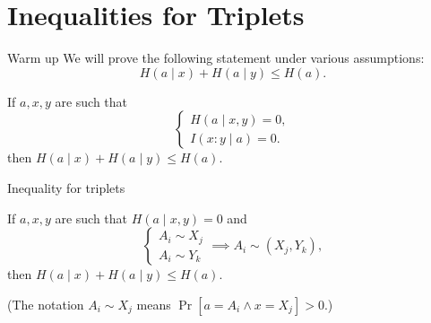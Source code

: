 \documentclass[handout,aspectratio=169]{beamer}
\begin{document}
	\section{Inequalities for Triplets}
    \begin{frame}{Warm up}
		We will prove the following statement under various assumptions:
		\[
		    H(a \mid x) + H(a \mid y) \le H(a).
		\]
		
		\begin{problem}
		    If \(a, x, y\) are such that
		\[
		    \begin{cases}
		        H(a \mid x, y) = 0,\\
		        I(x : y \mid a) = 0.
		    \end{cases}
		\]
		then \(H(a \mid x) + H(a \mid y) \le H(a)\).
		\end{problem}
    \end{frame}

    \begin{frame}{Inequality for triplets}
    \begin{theorem}
        If \(a, x, y\) are such that \(H(a \mid x, y) = 0\) and
    \[
        \begin{cases}
            A_i \sim X_j\\
            A_i \sim Y_k
        \end{cases} \implies A_i \sim (X_j, Y_k),
    \]
    then \(H(a \mid x) + H(a \mid y) \le H(a)\).
    \end{theorem}

    \medskip (The notation \(A_i \sim X_j\) means \(\Pr[a = A_i \land x = X_j] > 0\).)
    \end{frame}
\end{document}
